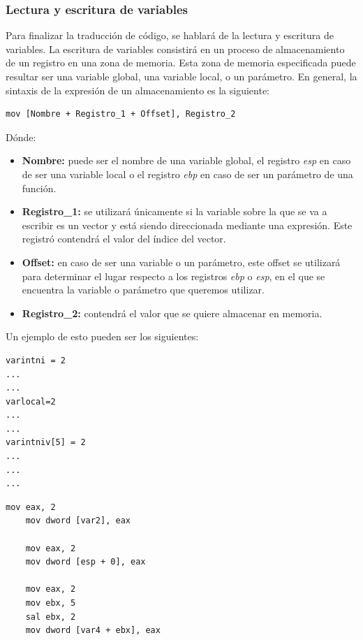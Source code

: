 \documentclass[a4paper,10pt]{article}
\begin{document}
\subsubsection{Lectura y escritura de variables}

Para finalizar la traducción de código, se hablará de la lectura y escritura de variables. La escritura de variables consistirá en un proceso de almacenamiento de un registro en una zona de memoria. Esta zona de memoria especificada puede resultar ser una variable global, una variable local, o un parámetro. En general, la sintaxis de la expresión de un almacenamiento es la siguiente:

\begin{lstlisting}
mov [Nombre + Registro_1 + Offset], Registro_2
\end{lstlisting}
\noindent Dónde:
\begin{itemize}
\item \textbf{Nombre:} puede ser el nombre de una variable global, el registro \textit{esp} en caso de ser una variable local o el registro \textit{ebp} en caso de ser un parámetro de una función.
\item \textbf{Registro\_1:} se utilizará únicamente si la variable sobre la que se va a escribir es un vector y está siendo direccionada mediante una expresión. Este registró contendrá el valor del índice del vector.
\item \textbf{Offset:} en caso de ser una variable o un parámetro, este offset se utilizará para determinar el lugar respecto a los registros \textit{ebp} o \textit{esp}, en el que se encuentra la variable o parámetro que queremos utilizar.
\item \textbf{Registro\_2:} contendrá el valor que se quiere almacenar en memoria.
\end{itemize}


Un ejemplo de esto pueden ser los siguientes:
\begin{multicols}{2}
\begin{lstlisting}[language=jam,frame=single]
varintni = 2
...
...
varlocal=2
...
...
varintniv[5] = 2
...
...
...
\end{lstlisting}
\begin{lstlisting}[frame=single]
	mov eax, 2
	mov dword [var2], eax

	mov eax, 2
	mov dword [esp + 0], eax
	
	mov eax, 2
	mov ebx, 5
	sal ebx, 2
	mov dword [var4 + ebx], eax
\end{lstlisting}
\end{multicols}
\end{document}
